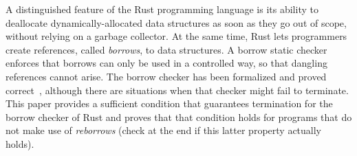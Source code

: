 A distinguished feature of the Rust programming language
is its ability to deallocate dynamically-allocated
data structures as soon as they go out of scope, without relying on a garbage
collector. At the same time, Rust lets programmers create references,
called \emph{borrows}, to data structures. A borrow static checker enforces
that borrows can only be used in a controlled way, so that dangling references cannot arise.
The borrow checker has been formalized and proved correct~\cite{Pearce21}, although there
are situations when that checker might fail to terminate.
This paper provides a sufficient condition that guarantees termination for the borrow checker
of Rust and proves that that condition holds for programs that do not make use of \emph{reborrows}
(check at the end if this latter property actually holds).
